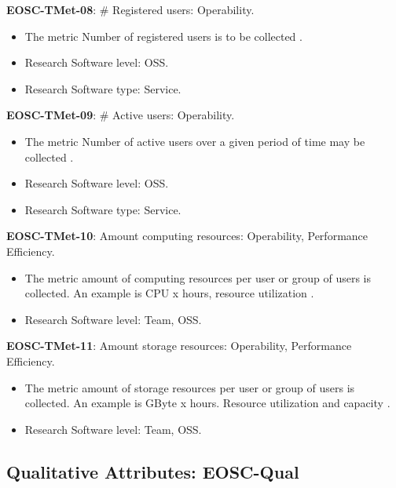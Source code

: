 \textbf{EOSC-TMet-08}: \# Registered users: Operability.

\begin{itemize}
    \item The metric Number of registered users is to be collected \cite{orviz_fernandez_eosc-synergy_2020}.
    \item Research Software level: OSS.
    \item Research Software type: Service.
\end{itemize}

\textbf{EOSC-TMet-09}: \# Active users: Operability.

\begin{itemize}
    \item The metric Number of active users over a given period of time may be collected \cite{orviz_fernandez_eosc-synergy_2020}.
    \item Research Software level: OSS.
    \item Research Software type: Service.
\end{itemize}

\textbf{EOSC-TMet-10}: Amount computing resources: Operability, Performance Efficiency.

\begin{itemize}
    \item The metric amount of computing resources per user or group of users is collected. An example is CPU x hours, resource utilization \cite{iso_25010_2011_2017,orviz_fernandez_eosc-synergy_2020}.
    \item Research Software level: Team, OSS.
\end{itemize}

\textbf{EOSC-TMet-11}: Amount storage resources: Operability, Performance Efficiency.

\begin{itemize}
    \item The metric amount of storage resources per user or group of users is collected. An example is GByte x hours. Resource utilization and capacity \cite{iso_25010_2011_2017,orviz_fernandez_eosc-synergy_2020}.
    \item Research Software level: Team, OSS.
\end{itemize}

\subsection{Qualitative Attributes: EOSC-Qual}

